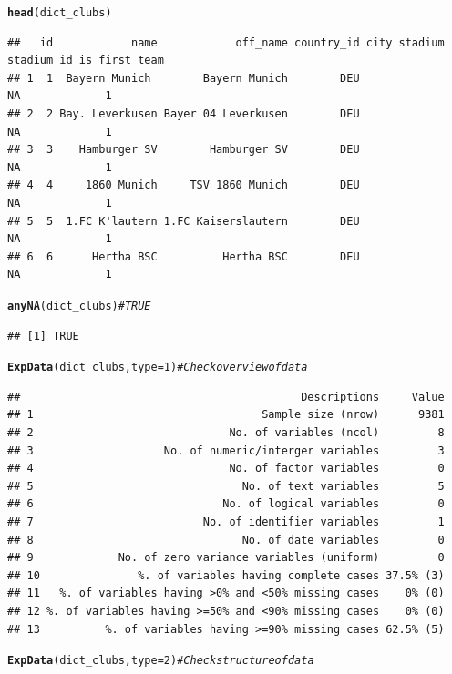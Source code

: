 \documentclass{article}\usepackage[]{graphicx}\usepackage[]{color}
\makeatletter
\newcommand{\hlnum}[1]{\textcolor[rgb]{0.686,0.059,0.569}{#1}}%
\newcommand{\hlcom}[1]{\textcolor[rgb]{0.678,0.584,0.686}{\textit{#1}}}%
\newcommand{\hlstd}[1]{\textcolor[rgb]{0.345,0.345,0.345}{#1}}%
\newcommand{\hlkwc}[1]{\textcolor[rgb]{0.333,0.667,0.333}{#1}}%
\newcommand{\hlkwd}[1]{\textcolor[rgb]{0.737,0.353,0.396}{\textbf{#1}}}%
\newenvironment{kframe}{%
 \def\at@end@of@kframe{}%
 \ifinner\ifhmode%
  \def\at@end@of@kframe{\end{minipage}}%
  \begin{minipage}{\columnwidth}%
 \fi\fi%
 \def\FrameCommand##1{\hskip\@totalleftmargin \hskip-\fboxsep
 \colorbox{shadecolor}{##1}\hskip-\fboxsep
     \hskip-\linewidth \hskip-\@totalleftmargin \hskip\columnwidth}%
 \MakeFramed {\advance\hsize-\width
   \@totalleftmargin\z@ \linewidth\hsize
   \@setminipage}}%
 {\par\unskip\endMakeFramed%
 \at@end@of@kframe}
\newenvironment{knitrout}{}{} %
\makeatother
\begin{document}
\begin{knitrout}
\begin{kframe}
\begin{alltt}
\hlkwd{head}\hlstd{(dict_clubs)}
\end{alltt}
\begin{verbatim}
##   id            name            off_name country_id city stadium stadium_id is_first_team
## 1  1  Bayern Munich        Bayern Munich        DEU                      NA             1
## 2  2 Bay. Leverkusen Bayer 04 Leverkusen        DEU                      NA             1
## 3  3    Hamburger SV        Hamburger SV        DEU                      NA             1
## 4  4     1860 Munich     TSV 1860 Munich        DEU                      NA             1
## 5  5  1.FC K'lautern 1.FC Kaiserslautern        DEU                      NA             1
## 6  6      Hertha BSC          Hertha BSC        DEU                      NA             1
\end{verbatim}
\begin{alltt}
\hlkwd{anyNA}\hlstd{(dict_clubs)} \hlcom{# TRUE}
\end{alltt}
\begin{verbatim}
## [1] TRUE
\end{verbatim}
\begin{alltt}
\hlkwd{ExpData}\hlstd{(dict_clubs,} \hlkwc{type}\hlstd{=}\hlnum{1}\hlstd{)} \hlcom{# Check overview of data}
\end{alltt}
\begin{verbatim}
##                                           Descriptions     Value
## 1                                   Sample size (nrow)      9381
## 2                              No. of variables (ncol)         8
## 3                    No. of numeric/interger variables         3
## 4                              No. of factor variables         0
## 5                                No. of text variables         5
## 6                             No. of logical variables         0
## 7                          No. of identifier variables         1
## 8                                No. of date variables         0
## 9             No. of zero variance variables (uniform)         0
## 10               %. of variables having complete cases 37.5% (3)
## 11   %. of variables having >0% and <50% missing cases    0% (0)
## 12 %. of variables having >=50% and <90% missing cases    0% (0)
## 13          %. of variables having >=90% missing cases 62.5% (5)
\end{verbatim}
\begin{alltt}
\hlkwd{ExpData}\hlstd{(dict_clubs,} \hlkwc{type}\hlstd{=}\hlnum{2}\hlstd{)} \hlcom{# Check structure of data}

\end{alltt}
\end{kframe}
\end{knitrout}
\end{document}
